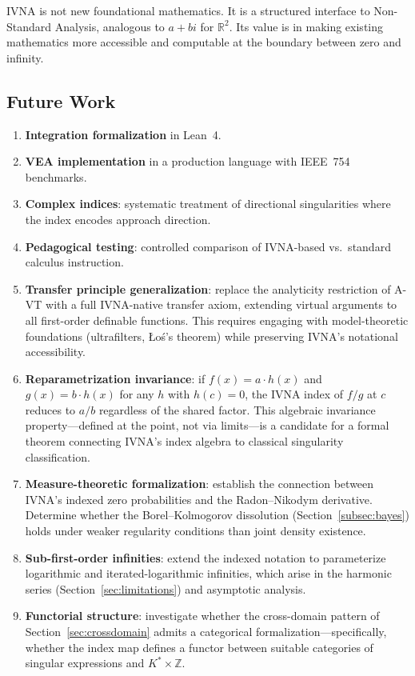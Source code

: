 \documentclass[12pt]{article}
\theoremstyle{definition}
\theoremstyle{remark}
\newcommand{\R}{\mathbb{R}}
\begin{document}
IVNA is not new foundational mathematics. It is a structured interface to
Non-Standard Analysis, analogous to $a + bi$ for $\R^2$. Its value is in
making existing mathematics more accessible and computable at the boundary
between zero and infinity.

\subsection{Future Work}

\begin{enumerate}
\item \textbf{Integration formalization} in Lean~4.
\item \textbf{VEA implementation} in a production language with IEEE~754
  benchmarks.
\item \textbf{Complex indices}: systematic treatment of directional
  singularities where the index encodes approach direction.
\item \textbf{Pedagogical testing}: controlled comparison of IVNA-based
  vs.\ standard calculus instruction.
\item \textbf{Transfer principle generalization}: replace the analyticity
  restriction of A-VT with a full IVNA-native transfer axiom, extending
  virtual arguments to all first-order definable functions. This requires
  engaging with model-theoretic foundations (ultrafilters, \L o\'s's theorem)
  while preserving IVNA's notational accessibility.
\item \textbf{Reparametrization invariance}: if $f(x) = a \cdot h(x)$
  and $g(x) = b \cdot h(x)$ for any $h$ with $h(c) = 0$, the IVNA index
  of $f/g$ at $c$ reduces to $a/b$ regardless of the shared factor. This
  algebraic invariance property---defined at the point, not via limits---is
  a candidate for a formal theorem connecting IVNA's index algebra to
  classical singularity classification.
\item \textbf{Measure-theoretic formalization}: establish the
  connection between IVNA's indexed zero probabilities and the
  Radon--Nikodym derivative. Determine whether the
  Borel--Kolmogorov dissolution
  (Section~\ref{subsec:bayes}) holds under weaker regularity
  conditions than joint density existence.
\item \textbf{Sub-first-order infinities}: extend the indexed
  notation to parameterize logarithmic and iterated-logarithmic
  infinities, which arise in the harmonic series
  (Section~\ref{sec:limitations}) and asymptotic analysis.
\item \textbf{Functorial structure}: investigate whether the
  cross-domain pattern of Section~\ref{sec:crossdomain} admits
  a categorical formalization---specifically, whether the index
  map defines a functor between suitable categories of singular
  expressions and $K^* \times \mathbb{Z}$.
\end{enumerate}
\end{document}
